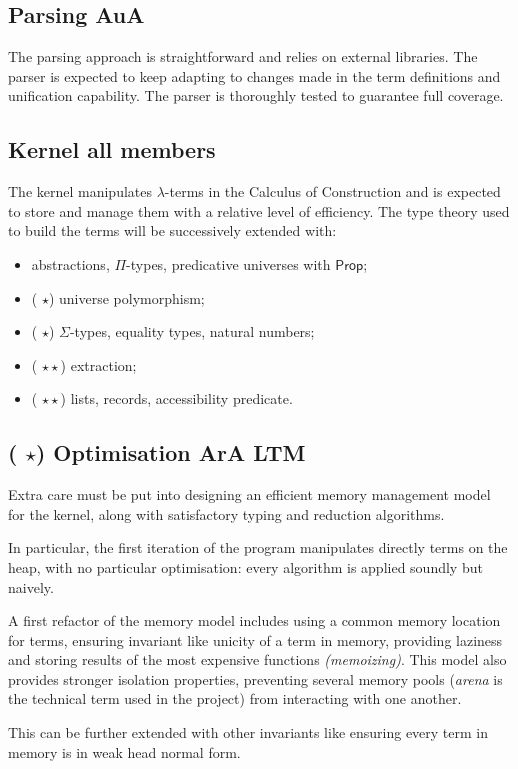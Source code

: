 \documentclass[twocolumn]{article}
\newcommand{\members}[1]{\texorpdfstring{\hfill\scriptsize #1}{}}
\newcommand{\etun}{({\color{Green} $\star$}) }
\newcommand{\etde}{({\color{Orange} $\star\star$}) }
\begin{document}
\subsection{Parsing \members{AuA}}
The parsing approach is straightforward and relies on external libraries. The parser is expected to keep adapting to changes made in the term definitions and unification capability. The parser is thoroughly tested to guarantee full coverage.


\subsection{Kernel \members{all members}}
The kernel manipulates \(\lambda\)-terms in the Calculus of Construction and is expected to store and manage them with a relative level of efficiency. The type theory used to build the terms will be successively extended with:
\begin{itemize}
  \item abstractions, \(\Pi\)-types, predicative universes with \(\mathsf{Prop}\);
  \item \etun universe polymorphism;
  \item \etun \(\Sigma\)-types, equality types, natural numbers;
  \item \etde extraction;
  \item \etde lists, records, accessibility predicate.
\end{itemize}


\subsection{\etun Optimisation \members{ArA LTM}}
Extra care must be put into designing an efficient memory management model for
the kernel, along with satisfactory typing and reduction algorithms.

In particular, the first iteration of the program manipulates directly terms on
the heap, with no particular optimisation: every algorithm is applied soundly
but naively.

A first refactor of the memory model includes using a common memory location for
terms, ensuring invariant like unicity of a term in memory, providing laziness
and storing results of the most expensive functions \emph{(memoizing)}.
This model also provides stronger isolation properties, preventing several
memory pools (\emph{arena} is the technical term used in the project) from
interacting with one another.

This can
be further extended with other invariants like ensuring every term in memory is
in weak head normal form.
\end{document}
